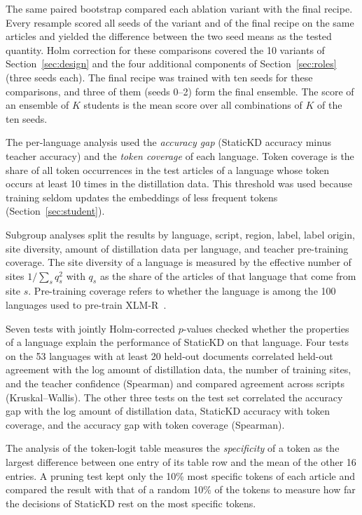 \documentclass{ieeeaccess}
\begin{document}
The same paired bootstrap compared each ablation variant with the final recipe. Every resample scored all seeds of the variant and of the final recipe on the same articles and yielded the difference between the two seed means as the tested quantity. Holm correction for these comparisons covered the 10 variants of Section~\ref{sec:design} and the four additional components of Section~\ref{sec:roles} (three seeds each). The final recipe was trained with ten seeds for these comparisons, and three of them (seeds 0--2) form the final ensemble. The score of an ensemble of $K$ students is the mean score over all combinations of $K$ of the ten seeds.

The per-language analysis used the \emph{accuracy gap} (StaticKD accuracy minus teacher accuracy) and the \emph{token coverage} of each language. Token coverage is the share of all token occurrences in the test articles of a language whose token occurs at least 10 times in the distillation data. This threshold was used because training seldom updates the embeddings of less frequent tokens (Section~\ref{sec:student}).

Subgroup analyses split the results by language, script, region, label, label origin, site diversity, amount of distillation data per language, and teacher pre-training coverage. The site diversity of a language is measured by the effective number of sites $1/\sum_s q_s^{2}$ with $q_s$ as the share of the articles of that language that come from site $s$. Pre-training coverage refers to whether the language is among the 100 languages used to pre-train XLM-R~\cite{conneau2020xlmr}.

Seven tests with jointly Holm-corrected $p$-values checked whether the properties of a language explain the performance of StaticKD on that language. Four tests on the 53 languages with at least 20 held-out documents correlated held-out agreement with the log amount of distillation data, the number of training sites, and the teacher confidence (Spearman) and compared agreement across scripts (Kruskal--Wallis). The other three tests on the test set correlated the accuracy gap with the log amount of distillation data, StaticKD accuracy with token coverage, and the accuracy gap with token coverage (Spearman).

The analysis of the token-logit table measures the \emph{specificity} of a token as the largest difference between one entry of its table row and the mean of the other 16 entries. A pruning test kept only the 10\% most specific tokens of each article and compared the result with that of a random 10\% of the tokens to measure how far the decisions of StaticKD rest on the most specific tokens.
\end{document}
